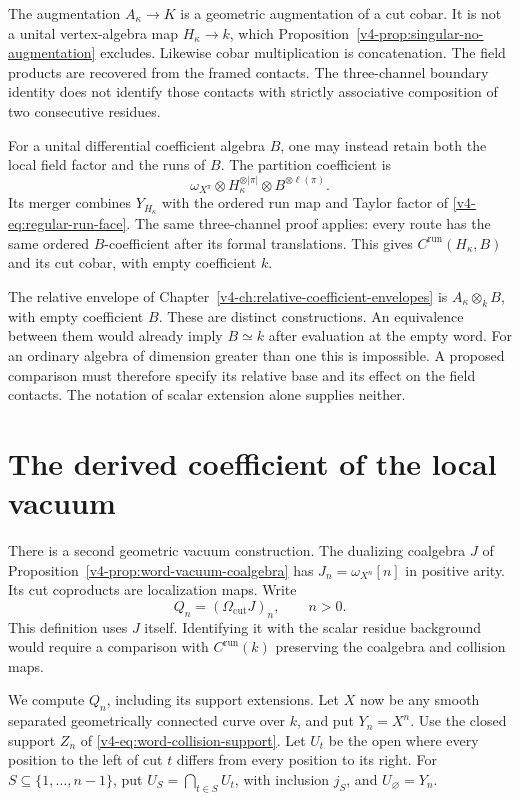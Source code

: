 The augmentation \(A_\kappa\to K\) is a geometric
augmentation of a cut cobar. It is not a unital
vertex-algebra map \(H_\kappa\to k\), which
Proposition~\ref{v4-prop:singular-no-augmentation} excludes.
Likewise cobar multiplication is concatenation. The
field products are recovered from the framed contacts.
The three-channel boundary identity does not identify
those contacts with strictly associative composition
of two consecutive residues.

For a unital differential coefficient algebra \(B\),
one may instead retain both the local field factor
and the runs of \(B\). The partition coefficient is
\[
 \omega_{X^\pi}\otimes H_\kappa^{\otimes|\pi|}
                         \otimes B^{\otimes\ell(\pi)}.
\]
Its merger combines \(Y_{H_\kappa}\) with the ordered
run map and Taylor factor of
\eqref{v4-eq:regular-run-face}. The same three-channel
proof applies: every route has the same ordered
\(B\)-coefficient after its formal translations.
This gives \(C^{\mathrm{run}}(H_\kappa,B)\) and its
cut cobar, with empty coefficient \(k\).

The relative envelope of
Chapter~\ref{v4-ch:relative-coefficient-envelopes} is
\(A_\kappa\otimes_k B\), with empty coefficient \(B\).
These are distinct constructions. An equivalence
between them would already imply \(B\simeq k\)
after evaluation at the empty word. For an ordinary
algebra of dimension greater than one this is
impossible. A proposed comparison must therefore
specify its relative base and its effect on the
field contacts. The notation of scalar extension
alone supplies neither.

\section{The derived coefficient of the local vacuum}
\label{v4-sec:singular-vacuum-width}

There is a second geometric vacuum construction.
The dualizing coalgebra \(J\) of
Proposition~\ref{v4-prop:word-vacuum-coalgebra}
has \(J_n=\omega_{X^n}[n]\) in positive arity.
Its cut coproducts are localization maps.
Write
\[
             Q_n=(\Omega_{\mathrm{cut}}J)_n,\qquad n>0.
\]
This definition uses \(J\) itself.
Identifying it with the scalar residue background
would require a comparison with
\(C^{\mathrm{run}}(k)\) preserving the coalgebra
and collision maps.

We compute \(Q_n\), including its support extensions.
Let \(X\) now be any smooth separated
geometrically connected curve over \(k\), and
put \(Y_n=X^n\).
Use the closed support \(Z_n\) of
\eqref{v4-eq:word-collision-support}.
Let \(U_t\) be the open where every
position to the left of cut \(t\)
differs from every position to its right.
For \(S\subseteq\{1,\ldots,n-1\}\), put
\(U_S=\bigcap_{t\in S}U_t\), with inclusion
\(j_S\), and \(U_\varnothing=Y_n\).

